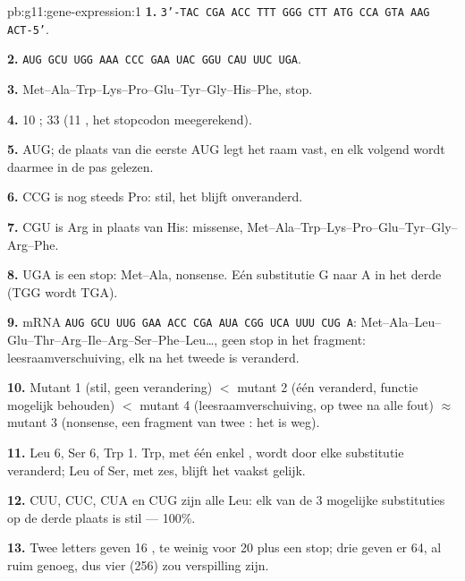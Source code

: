 \begin{solution}{pb:g11:gene-expression:1}
\textbf{1.} \texttt{3'-TAC CGA ACC TTT GGG CTT ATG CCA GTA AAG ACT-5'}.

\textbf{2.} \texttt{AUG GCU UGG AAA CCC GAA UAC GGU CAU UUC UGA}.

\textbf{3.} Met--Ala--Trp--Lys--Pro--Glu--Tyr--Gly--His--Phe, stop.

\textbf{4.} 10 ; 33  (11 , het stopcodon
meegerekend).

\textbf{5.} AUG; de plaats van die eerste AUG legt het raam vast, en elk
volgend  wordt daarmee in de pas gelezen.

\textbf{6.} CCG is nog steeds Pro: stil, het  blijft onveranderd.

\textbf{7.} CGU is Arg in plaats van His: missense,
Met--Ala--Trp--Lys--Pro--Glu--Tyr--Gly--Arg--Phe.

\textbf{8.} UGA is een stop: Met--Ala, nonsense. Eén substitutie G naar A
in het derde  (TGG wordt TGA).

\textbf{9.} mRNA \texttt{AUG GCU UUG GAA ACC CGA AUA CGG UCA UUU CUG
A}: Met--Ala--Leu--Glu--Thr--Arg--Ile--Arg--Ser--Phe--Leu\dots, geen stop
in het fragment: leesraamverschuiving, elk  na het tweede is
veranderd.

\textbf{10.} Mutant 1 (stil, geen verandering) $<$ mutant 2 (één
 veranderd, functie mogelijk behouden) $<$ mutant 4
(leesraamverschuiving, op twee na alle  fout) $\approx$ mutant 3
(nonsense, een fragment van twee : het  is weg).

\textbf{11.} Leu 6, Ser 6, Trp 1. Trp, met één enkel , wordt door
elke substitutie veranderd; Leu of Ser, met zes, blijft het vaakst gelijk.

\textbf{12.} CUU, CUC, CUA en CUG zijn alle Leu: elk van de 3 mogelijke
substituties op de derde plaats is stil --- 100\%.

\textbf{13.} Twee letters geven 16 , te weinig voor 20 
plus een stop; drie geven er 64, al ruim genoeg, dus vier (256) zou
verspilling zijn.


\end{solution}
